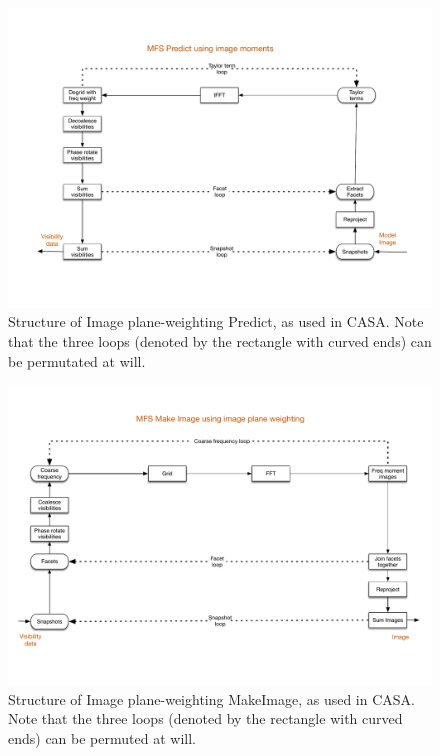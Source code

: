 \documentclass[11pt,a4paper]{article}
\begin{document}
\begin{figure}[htb]
  \centering
  \includegraphics[width=\textwidth]{./MSMFS_Predict_Image.pdf}
  \caption{Structure of Image plane-weighting Predict, as used in CASA. Note that the three loops (denoted by the rectangle with curved ends) can be permutated at will.}
  \label{fig:makeimageuv}
\end{figure}


\begin{figure}[htb]
  \centering
  \includegraphics[width=\textwidth]{./MSMFS_MakeImage_Image.pdf}
  \caption{Structure of Image plane-weighting MakeImage, as used in CASA. Note that the three loops (denoted by the rectangle with curved ends) can be permuted at will.}
  \label{fig:makeimageimage}
\end{figure}
\end{document}
